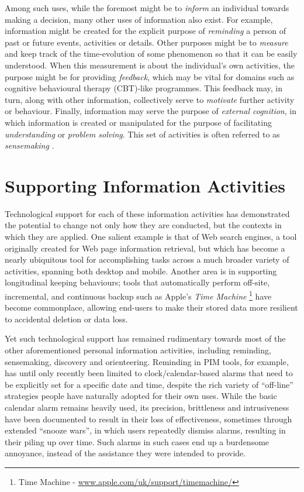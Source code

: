 \documentclass[runningheads,a4paper]{llncs}
\begin{document}
Among such uses, while the foremost might be to \emph{inform} an individual towards making a decision, many other uses of information also exist.  For example, information might be created for the explicit purpose of \emph{reminding} a person of past or future events, activities or details. Other purposes might be to \emph{measure} and keep track of the time-evolution of some phenomenon so that it can be easily understood.  When this measurement is about the individual's own activities, the purpose might be for providing \emph{feedback}, which may be vital for domains such as cognitive behavioural therapy (CBT)-like programmes.  This feedback may, in turn, along with other information, collectively serve to \emph{motivate} further activity or behaviour.  Finally, information may serve the purpose of \emph{external cognition}, in which information is created or manipulated for the purpose of facilitating \emph{understanding} or \emph{problem solving}.  This set of activities is often referred to as \emph{sensemaking} \cite{pirolli2005sensemaking}.

\section{Supporting Information Activities}

Technological support for each of these information activities has demonstrated the potential to change not only how they are conducted, but the contexts in which they are applied.  One salient example is that of Web search engines, a tool originally created for Web page information retrieval, but which has become a nearly ubiquitous tool for accomplishing tasks across a much broader variety of activities, spanning both desktop and mobile.   Another area is in supporting longitudinal keeping behaviours; tools that automatically perform off-site, incremental, and continuous backup such as Apple's \emph{Time Machine} \footnote{Time Machine - \url{www.apple.com/uk/support/timemachine/‎}} have become commonplace, allowing end-users to make their stored data more resilient to accidental deletion or data loss.

Yet such technological support has remained rudimentary towards most of the other aforementioned personal information activities, including reminding, sensemaking, discovery and orienteering.  Reminding in PIM tools, for example, has until only recently been limited to clock/calendar-based alarms that need to be explicitly set for a specific date and time, despite the rich variety of ``off-line'' strategies people have naturally adopted for their own uses\cite{belottitodo}.  While the basic calendar alarm remains heavily used, its precision, brittleness and intrusiveness have been documented to result in their loss of effectiveness, sometimes through extended  ``snooze wars'', in which users repeatedly dismiss alarms, resulting in their piling up over time.  Such alarms in such cases end up a burdensome annoyance, instead of the assistance they were intended to provide.  
\end{document}
